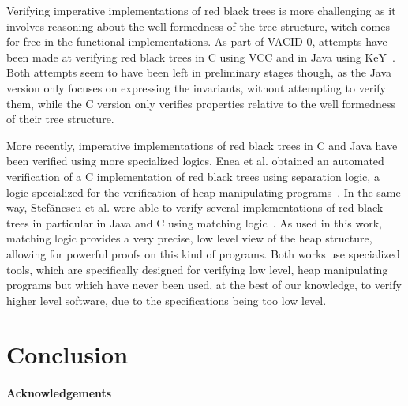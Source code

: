 \documentclass[11pt,a4paper]{article}
\begin{document}
Verifying imperative implementations of red black trees is more challenging as it involves reasoning about the well formedness
of the tree structure, witch comes for free in the functional implementations. As part of VACID-0, attempts have been made at
verifying red black trees in C using VCC and in Java using KeY~\cite{bruns2011specification}.
Both attempts seem to have been left in preliminary stages
though, as the Java version only focuses on expressing the invariants, without attempting to verify them, while the C
version only verifies properties relative to the well formedness of their tree structure.

More recently, imperative implementations of red black trees in C and Java have been verified using more specialized logics.
Enea et al. obtained an automated verification of a C implementation of red black trees using separation logic, a logic
specialized for the verification of heap manipulating programs~\cite{enea2015automated}. In the
same way, Stef{\u{a}}nescu et al. were able to verify several implementations of red black trees in particular in Java and
C using matching logic~\cite{stefuanescu2016semantics}. As used in this work, matching logic provides a very precise, low
level view of the heap structure, allowing for powerful proofs on this kind of programs. Both works use specialized tools,
which are specifically designed for verifying low level, heap manipulating programs but which have never been used, at the best
of our knowledge, to verify higher level software, due to the specifications being too low level.

\section{Conclusion}


\paragraph*{Acknowledgements}




\end{document}
